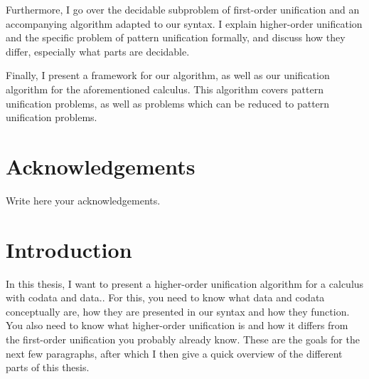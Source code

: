 \documentclass[twoside,12pt,a4paper]{article}
\begin{document}
Furthermore, I go over the decidable subproblem of first-order unification and an accompanying algorithm adapted to our syntax.
I explain higher-order unification and the specific problem of pattern unification formally, 
and discuss how they differ, especially what parts are decidable.

Finally, I present a framework for our algorithm, as well as our unification algorithm for the aforementioned calculus. 
This algorithm covers pattern unification problems, as well as problems which can be reduced to pattern unification problems.


\newpage
\section*{Acknowledgements}

Write here your acknowledgements.

\cleardoublepage


\renewcommand{\baselinestretch}{1.3}
\small\normalsize

\tableofcontents

\renewcommand{\baselinestretch}{1}
\small\normalsize

\cleardoublepage


\setcounter{page}{1}

\section{Introduction}

In this thesis, I want to present a higher-order unification algorithm for a calculus with codata and data.. 
For this, you need to know what data and codata conceptually are, how they are presented in our syntax and how they function.
You also need to know what higher-order unification is and how it differs from the first-order unification you probably already know.
These are the goals for the next few paragraphs, after which I then give a quick overview of the different parts of this thesis.
\end{document}
